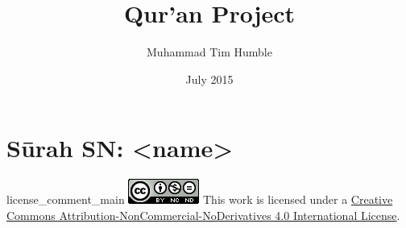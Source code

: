 \documentclass{book}
\title{Qur'an Project}
\author{Muhammad Tim Humble}
\date{July 2015}
\begin{document}
\maketitle
\END

\section{Sūrah SN: <name>}
\END

\begin{taggedblock}{license_comment_main}
\includegraphics{cc_88x31}
This work is licensed under a 
\href{http://creativecommons.org/licenses/by-nc-nd/4.0/}{Creative Commons Attribution-NonCommercial-NoDerivatives 4.0 International License}.
\end{taggedblock}
\end{document}
